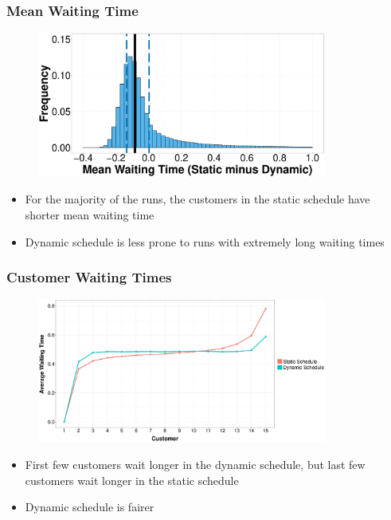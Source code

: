 \documentclass{beamer}
\begin{document}
\begin{frame}
	\frametitle{Mean Waiting Time}

	\begin{figure}
		\centering
		\includegraphics[width=0.85\textwidth]{WT_Hist_Diff.eps}
	\end{figure}

	\begin{itemize}
		\item For the majority of the runs, the customers in the static schedule have shorter mean waiting time
		\item Dynamic schedule is less prone to runs with extremely long waiting times
	\end{itemize}
\end{frame}

\begin{frame}
	\frametitle{Customer Waiting Times}

	\begin{figure}
			\centering
			\includegraphics[width=0.85\textwidth]{WT_Line_Avg.eps}
	\end{figure}
		
	\begin{itemize}
		\item First few customers wait longer in the dynamic schedule, but last few customers wait longer in the static schedule
		\item Dynamic schedule is fairer
	\end{itemize}
\end{frame}
\end{document}
